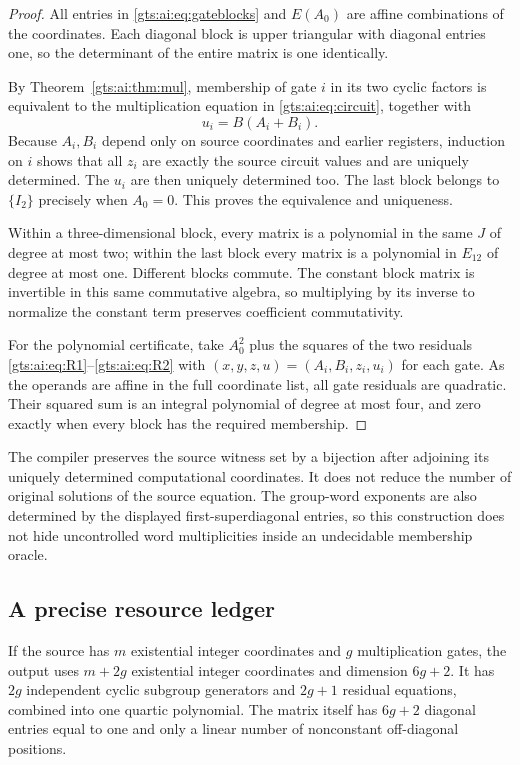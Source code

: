 \documentclass[11pt,letterpaper]{article}
\theoremstyle{definition}
\theoremstyle{remark}
\begin{document}
\begin{proof}
All entries in \eqref{gts:ai:eq:gateblocks} and $E(A_0)$ are affine combinations of the coordinates. Each diagonal block is upper triangular with diagonal entries one, so the determinant of the entire matrix is one identically.

By Theorem~\ref{gts:ai:thm:mul}, membership of gate $i$ in its two cyclic factors is equivalent to the multiplication equation in \eqref{gts:ai:eq:circuit}, together with
\[
 u_i=B(A_i+B_i).
\]
Because $A_i,B_i$ depend only on source coordinates and earlier registers, induction on $i$ shows that all $z_i$ are exactly the source circuit values and are uniquely determined. The $u_i$ are then uniquely determined too. The last block belongs to $\{I_2\}$ precisely when $A_0=0$. This proves the equivalence and uniqueness.

Within a three-dimensional block, every matrix is a polynomial in the same $J$ of degree at most two; within the last block every matrix is a polynomial in $E_{12}$ of degree at most one. Different blocks commute. The constant block matrix is invertible in this same commutative algebra, so multiplying by its inverse to normalize the constant term preserves coefficient commutativity.

For the polynomial certificate, take $A_0^2$ plus the squares of the two residuals \eqref{gts:ai:eq:R1}--\eqref{gts:ai:eq:R2} with $(x,y,z,u)=(A_i,B_i,z_i,u_i)$ for each gate. As the operands are affine in the full coordinate list, all gate residuals are quadratic. Their squared sum is an integral polynomial of degree at most four, and zero exactly when every block has the required membership.
\end{proof}
The compiler preserves the source witness set by a bijection after adjoining its uniquely determined computational coordinates. It does not reduce the number of original solutions of the source equation. The group-word exponents are also determined by the displayed first-superdiagonal entries, so this construction does not hide uncontrolled word multiplicities inside an undecidable membership oracle.

\subsection{A precise resource ledger}
If the source has $m$ existential integer coordinates and $g$ multiplication gates, the output uses $m+2g$ existential integer coordinates and dimension $6g+2$. It has $2g$ independent cyclic subgroup generators and $2g+1$ residual equations, combined into one quartic polynomial. The matrix itself has $6g+2$ diagonal entries equal to one and only a linear number of nonconstant off-diagonal positions.
\end{document}
